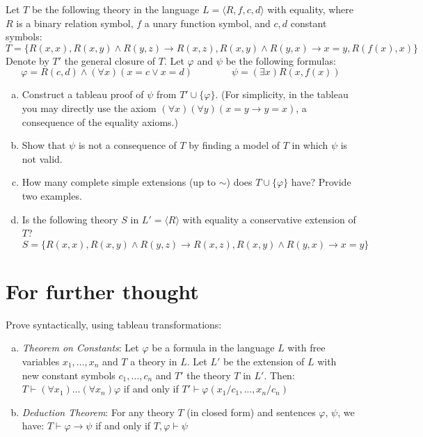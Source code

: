\begin{problem} 

    Let $T$ be the following theory in the language $L=\langle R,f,c,d\rangle$ with equality, where $R$ is a binary relation symbol, $f$ a unary function symbol, and $c,d$ constant symbols:
    $$
    T=\{R(x,x),R(x,y)\wedge R(y,z)\to R(x,z),R(x,y)\wedge R(y,x)\to x=y,R(f(x),x)\}
    $$
    Denote by $T'$ the general closure of $T$. Let $\varphi$ and $\psi$ be the following formulas:
    $$
    \varphi = R(c,d) \wedge (\forall x)(x=c\vee x=d)\qquad\qquad
    \psi = (\exists x)R(x,f(x))
    $$
    \begin{enumerate}[(a)]
        \item Construct a tableau proof of $\psi$ from $T'\cup\{\varphi\}$. (For simplicity, in the tableau you may directly use the axiom $(\forall x)(\forall y)(x=y\to y=x)$, a consequence of the equality axioms.)
        \item Show that $\psi$ is not a consequence of $T$ by finding a model of $T$ in which $\psi$ is not valid.
        \item How many complete simple extensions (up to $\sim$) does $T\cup \{\varphi\}$ have? Provide two examples.
        \item Is the following theory $S$ in $L'=\langle R\rangle$ with equality a conservative extension of $T$?
        $$S=\{R(x,x),R(x,y)\wedge R(y,z)\to R(x,z),R(x,y)\wedge R(y,x)\to x=y\}$$     
    \end{enumerate}

\end{problem}


\section*{For further thought}


\begin{problem} 
    
    Prove syntactically, using tableau transformations:
    \begin{enumerate}[(a)]
        \item \emph{Theorem on Constants}: Let $\varphi$ be a formula in the language $L$ with free variables $x_1,\dots,x_n$ and $T$ a theory in $L$. Let $L'$ be the extension of $L$ with new constant symbols $c_1,\dots,c_n$ and $T'$ the theory $T$ in $L'$. Then:
        $T \vdash (\forall x_1)\dots(\forall x_n)\varphi$ if and only if $T'\vdash\varphi(x_1/c_1,\dots,x_n/c_n)$
        \item \emph{Deduction Theorem}: For any theory $T$ (in closed form) and sentences $\varphi$, $\psi$, we have: $T\vdash \varphi\to\psi$ if and only if $T,\varphi\vdash\psi$
    \end{enumerate}

\end{problem}


